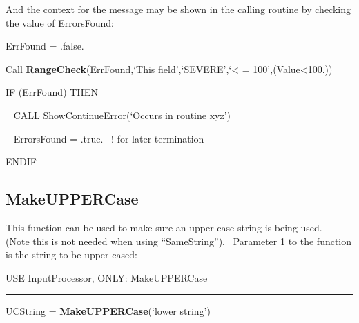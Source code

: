 And the context for the message may be shown in the calling routine by checking the value of ErrorsFound:

ErrFound = .false.

Call \textbf{RangeCheck}(ErrFound,`This field',`SEVERE',`\textless{} = 100',(Value\textless{}100.))

IF (ErrFound) THEN

~ CALL ShowContinueError(`Occurs in routine xyz')

~ ErrorsFound = .true.~ ! for later termination

ENDIF

\subsection{MakeUPPERCase}\label{makeuppercase}

This function can be used to make sure an upper case string is being used.~ (Note this is not needed when using ``SameString'').~ Parameter 1 to the function is the string to be upper cased:

USE InputProcessor, ONLY: MakeUPPERCase

\begin{center}\rule{0.5\linewidth}{0.4pt}\end{center}

UCString = \textbf{MakeUPPERCase}(`lower string')
